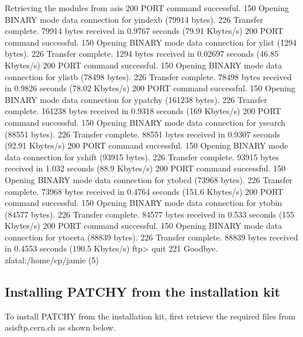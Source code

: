 \begin{XMPt}{Retrieving the modules from asis}
200 PORT command successful.
150 Opening BINARY mode data connection for yindexb (79914 bytes).
226 Transfer complete.
79914 bytes received in 0.9767 seconds (79.91 Kbytes/s)
200 PORT command successful.
150 Opening BINARY mode data connection for ylist (1294 bytes).
226 Transfer complete.
1294 bytes received in 0.02697 seconds (46.85 Kbytes/s)
200 PORT command successful.
150 Opening BINARY mode data connection for ylistb (78498 bytes).
226 Transfer complete.
78498 bytes received in 0.9826 seconds (78.02 Kbytes/s)
200 PORT command successful.
150 Opening BINARY mode data connection for ypatchy (161238 bytes).
226 Transfer complete.
161238 bytes received in 0.9318 seconds (169 Kbytes/s)
200 PORT command successful.
150 Opening BINARY mode data connection for ysearch (88551 bytes).
226 Transfer complete.
88551 bytes received in 0.9307 seconds (92.91 Kbytes/s)
200 PORT command successful.
150 Opening BINARY mode data connection for yshift (93915 bytes).
226 Transfer complete.
93915 bytes received in 1.032 seconds (88.9 Kbytes/s)
200 PORT command successful.
150 Opening BINARY mode data connection for ytobcd (73968 bytes).
226 Transfer complete.
73968 bytes received in 0.4764 seconds (151.6 Kbytes/s)
200 PORT command successful.
150 Opening BINARY mode data connection for ytobin (84577 bytes).
226 Transfer complete.
84577 bytes received in 0.533 seconds (155 Kbytes/s)
200 PORT command successful.
150 Opening BINARY mode data connection for ytoceta (88839 bytes).
226 Transfer complete.
88839 bytes received in 0.4553 seconds (190.5 Kbytes/s)
ftp> quit
221 Goodbye.
zfatal:/home/cp/jamie (5) 

\end{XMPt}


\subsection{Installing PATCHY from the installation kit}

To install PATCHY from the installation kit, first retrieve
the required files from asisftp.cern.ch as shown below.

